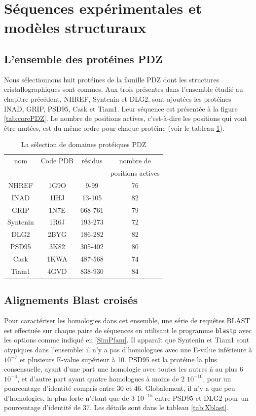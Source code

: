 \section{Séquences expérimentales et modèles structuraux}
\subsection{L'ensemble des protéines PDZ}
Nous sélectionnons huit protéines de la famille PDZ dont les structures cristallographiques sont connues. Aux trois présentes dans l'ensemble étudié au chapitre précédent, NHREF, Syntenin et DLG2, sont ajoutées les protéines INAD, GRIP, PSD95, Cask et Tiam1. Leur séquence est présentée à la figure \ref{tab:corePDZ}. Le nombre de positions actives, c'est-à-dire les positions qui vont être mutées, est du même ordre pour chaque protéine (voir le tableau \ref{tab:protéines_PDZ}).

\begin{table}[!htbp]
  \centering
  \caption{La sélection de domaines protéiques PDZ}
  \begin{tabular}{cccc}
    \toprule
    nom & Code PDB & résidus &  nombre de \\
        &          &         & positions actives \\
    \cmidrule{1-4}
    NHREF    & 1G9O  & 9-99    & 76 \\
    INAD     & 1IHJ  & 13-105  & 82 \\
    GRIP     & 1N7E  & 668-761 & 79 \\
    Syntenin & 1R6J  & 193-273 & 72 \\
    DLG2     & 2BYG  & 186-282 & 82 \\
    PSD95    & 3K82  & 305-402 & 80 \\
    Cask     & 1KWA  & 487-568 & 74 \\
    Tiam1    & 4GVD  & 838-930 & 84 \\
    \bottomrule
    
  \end{tabular}      
  \label{tab:protéines_PDZ}      
\end{table}

\subsection{Alignements Blast croisés}
   
Pour caractériser les homologies dans cet ensemble, une série de requêtes BLAST est effectuée sur chaque paire de séquences en utilisant le programme \verb!blastp! avec les options comme indiqué en \ref{SimPfam}. Il apparaît que Syntenin et Tiam1 sont atypiques dans l'ensemble: il n'y a pas d'homologues avec une E-value inférieure à $10^{-7}$ et plusieurs E-value supérieur à 10. PSD95 est la protéine la plus consensuelle, ayant d'une part une homologie avec toutes les autres à au plus $6$ $10^{-4}$, et d'autre part ayant quatre homologues à moins de $2$ $10^{-10}$, pour un pourcentage d'identité compris entre $30$ et $46$. Globalement, il n'y a que peu d'homologies, la plus forte n'étant que de $3$ $10^{-15}$ entre PSD95 et DLG2 pour un pourcentage d'identité de $37$. Les détails sont dans le tableau \ref{tab:Xblast}.


